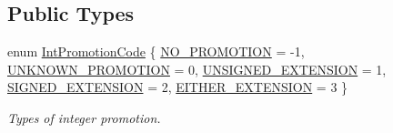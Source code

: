 \subsection*{Public Types}
\begin{DoxyCompactItemize}
\item 
enum \mbox{\hyperlink{class_cast_strategy_adbe7f8a73e5549983901c96592030747}{Int\+Promotion\+Code}} \{ \newline
\mbox{\hyperlink{class_cast_strategy_adbe7f8a73e5549983901c96592030747a8e88fbcebf0e2a049d1af0bd3c80eb27}{N\+O\+\_\+\+P\+R\+O\+M\+O\+T\+I\+ON}} = -\/1, 
\mbox{\hyperlink{class_cast_strategy_adbe7f8a73e5549983901c96592030747a9ad4ed1610a1b69ac874eb6672941b8b}{U\+N\+K\+N\+O\+W\+N\+\_\+\+P\+R\+O\+M\+O\+T\+I\+ON}} = 0, 
\mbox{\hyperlink{class_cast_strategy_adbe7f8a73e5549983901c96592030747a82b406f19bf091b8b9414a00c45bb43b}{U\+N\+S\+I\+G\+N\+E\+D\+\_\+\+E\+X\+T\+E\+N\+S\+I\+ON}} = 1, 
\mbox{\hyperlink{class_cast_strategy_adbe7f8a73e5549983901c96592030747acb2baf56a76264600d939cae5f68974e}{S\+I\+G\+N\+E\+D\+\_\+\+E\+X\+T\+E\+N\+S\+I\+ON}} = 2, 
\newline
\mbox{\hyperlink{class_cast_strategy_adbe7f8a73e5549983901c96592030747a876cfbd5f6442e6008758b58b516791e}{E\+I\+T\+H\+E\+R\+\_\+\+E\+X\+T\+E\+N\+S\+I\+ON}} = 3
 \}
\begin{DoxyCompactList}\small\item\em Types of integer promotion. \end{DoxyCompactList}\end{DoxyCompactItemize}
